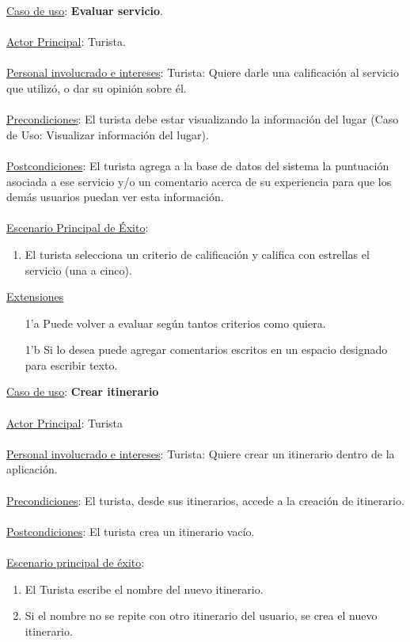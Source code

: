 \documentclass[12pt]{article}
\begin{document}
\underline{Caso de uso}: \textbf{Evaluar servicio}.\\\\
\underline{Actor Principal}: Turista.\\\\
\underline{Personal involucrado e intereses}: Turista: Quiere darle una calificación al servicio que utilizó, o dar su opinión sobre él.\\\\
\underline{Precondiciones}: El turista debe estar visualizando la información del lugar (Caso de Uso: Visualizar información del lugar).\\\\
\underline{Postcondiciones}: El turista agrega a la base de datos del sistema la puntuación asociada a ese servicio y/o un comentario acerca de su experiencia para que los demás usuarios puedan ver esta información.\\\\
\underline{Escenario Principal de Éxito}:
\begin{enumerate}
\item El turista selecciona un criterio de calificación y califica con estrellas el servicio (una a cinco).
\end{enumerate}
\underline{Extensiones}
\begin{enumerate}
\item[1'a] Puede volver a evaluar según tantos criterios como quiera.
\item[1'b] Si lo desea puede agregar comentarios escritos en un espacio designado para escribir texto. 
\end{enumerate}
\underline{Caso de uso}: \textbf{Crear itinerario}\\\\
\underline{Actor Principal}: Turista\\\\
\underline{Personal involucrado e intereses}: Turista: Quiere crear un itinerario dentro de la aplicación.\\\\
\underline{Precondiciones}: El turista, desde sus itinerarios, accede a la creación de itinerario.\\\\
\underline{Postcondiciones}: El turista crea un itinerario vacío.\\\\
\underline{Escenario principal de éxito}:
\begin{enumerate}
\item El Turista escribe el nombre del nuevo itinerario.
\item Si el nombre no se repite con otro itinerario del usuario, se crea el nuevo itinerario.
\end{enumerate}
\end{document}
